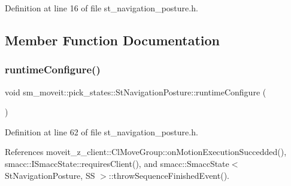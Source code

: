 Definition at line 16 of file st\+\_\+navigation\+\_\+posture.\+h.



\subsection{Member Function Documentation}
\mbox{\label{structsm__moveit_1_1pick__states_1_1StNavigationPosture_add5f3d828cb52f6320e5d60fbbf7dec6}} 
\subsubsection{\texorpdfstring{runtime\+Configure()}{runtimeConfigure()}}
{\footnotesize\ttfamily void sm\+\_\+moveit\+::pick\+\_\+states\+::\+St\+Navigation\+Posture\+::runtime\+Configure (\begin{DoxyParamCaption}{ }\end{DoxyParamCaption})\hspace{0.3cm}{\ttfamily [inline]}}



Definition at line 62 of file st\+\_\+navigation\+\_\+posture.\+h.



References moveit\+\_\+z\+\_\+client\+::\+Cl\+Move\+Group\+::on\+Motion\+Execution\+Succedded(), smacc\+::\+I\+Smacc\+State\+::requires\+Client(), and smacc\+::\+Smacc\+State$<$ St\+Navigation\+Posture, S\+S $>$\+::throw\+Sequence\+Finished\+Event().


